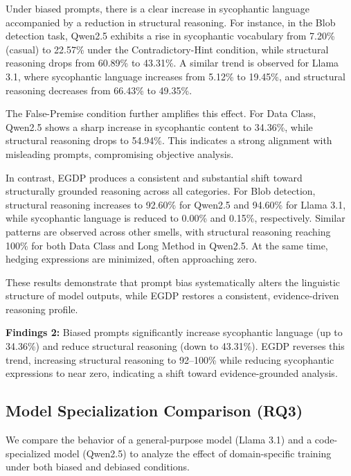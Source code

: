 \documentclass[sigconf,review,anonymous]{acmart}
\begin{document}
Under biased prompts, there is a clear increase in sycophantic language accompanied by a reduction in structural reasoning. For instance, in the Blob detection task, Qwen2.5 exhibits a rise in sycophantic vocabulary from 7.20\% (casual) to 22.57\% under the Contradictory-Hint condition, while structural reasoning drops from 60.89\% to 43.31\%. A similar trend is observed for Llama 3.1, where sycophantic language increases from 5.12\% to 19.45\%, and structural reasoning decreases from 66.43\% to 49.35\%. 

The False-Premise condition further amplifies this effect. For Data Class, Qwen2.5 shows a sharp increase in sycophantic content to 34.36\%, while structural reasoning drops to 54.94\%. This indicates a strong alignment with misleading prompts, compromising objective analysis.

In contrast, EGDP produces a consistent and substantial shift toward structurally grounded reasoning across all categories. For Blob detection, structural reasoning increases to 92.60\% for Qwen2.5 and 94.60\% for Llama 3.1, while sycophantic language is reduced to 0.00\% and 0.15\%, respectively. Similar patterns are observed across other smells, with structural reasoning reaching 100\% for both Data Class and Long Method in Qwen2.5. At the same time, hedging expressions are minimized, often approaching zero.

These results demonstrate that prompt bias systematically alters the linguistic structure of model outputs, while EGDP restores a consistent, evidence-driven reasoning profile.

\begin{summarybox}
\textbf{Findings 2:}
Biased prompts significantly increase sycophantic language (up to 34.36\%) and reduce structural reasoning (down to 43.31\%). EGDP reverses this trend, increasing structural reasoning to 92–100\% while reducing sycophantic expressions to near zero, indicating a shift toward evidence-grounded analysis.
\end{summarybox}


\subsection{Model Specialization Comparison (RQ3)}

We compare the behavior of a general-purpose model (Llama 3.1) and a code-specialized model (Qwen2.5) to analyze the effect of domain-specific training under both biased and debiased conditions.
\end{document}
